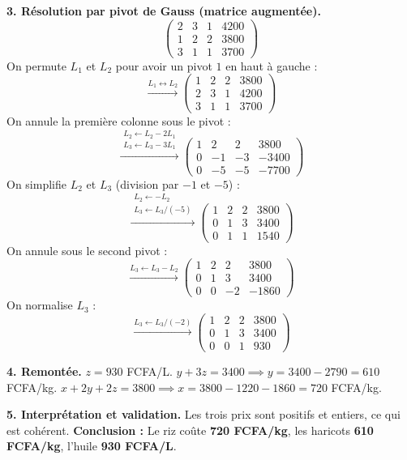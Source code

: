 \documentclass[11pt]{article}
\begin{document}
\begin{exoresolu}
\noindent\textbf{3. Résolution par pivot de Gauss (matrice augmentée).}
\[
\left(\begin{array}{ccc|c}
2 & 3 & 1 & 4200 \\
1 & 2 & 2 & 3800 \\
3 & 1 & 1 & 3700
\end{array}\right)
\]
On permute $L_1$ et $L_2$ pour avoir un pivot $1$ en haut à gauche :
\[
\xrightarrow{L_1 \leftrightarrow L_2}
\left(\begin{array}{ccc|c}
1 & 2 & 2 & 3800 \\
2 & 3 & 1 & 4200 \\
3 & 1 & 1 & 3700
\end{array}\right)
\]
On annule la première colonne sous le pivot :
\[
\xrightarrow{\substack{L_2 \leftarrow L_2 - 2L_1 \\ L_3 \leftarrow L_3 - 3L_1}}
\left(\begin{array}{ccc|c}
1 & 2 & 2 & 3800 \\
0 & -1 & -3 & -3400 \\
0 & -5 & -5 & -7700
\end{array}\right)
\]
On simplifie $L_2$ et $L_3$ (division par $-1$ et $-5$) :
\[
\xrightarrow{\substack{L_2 \leftarrow -L_2 \\ L_3 \leftarrow L_3 / (-5)}}
\left(\begin{array}{ccc|c}
1 & 2 & 2 & 3800 \\
0 & 1 & 3 & 3400 \\
0 & 1 & 1 & 1540
\end{array}\right)
\]
On annule sous le second pivot :
\[
\xrightarrow{L_3 \leftarrow L_3 - L_2}
\left(\begin{array}{ccc|c}
1 & 2 & 2 & 3800 \\
0 & 1 & 3 & 3400 \\
0 & 0 & -2 & -1860
\end{array}\right)
\]
On normalise $L_3$ :
\[
\xrightarrow{L_3 \leftarrow L_3 / (-2)}
\left(\begin{array}{ccc|c}
1 & 2 & 2 & 3800 \\
0 & 1 & 3 & 3400 \\
0 & 0 & 1 & 930
\end{array}\right)
\]

\noindent\textbf{4. Remontée.}
$z = 930$ FCFA/L.
$y + 3z = 3400 \implies y = 3400 - 2790 = 610$ FCFA/kg.
$x + 2y + 2z = 3800 \implies x = 3800 - 1220 - 1860 = 720$ FCFA/kg.

\noindent\textbf{5. Interprétation et validation.}
Les trois prix sont positifs et entiers, ce qui est cohérent.
\textbf{Conclusion :} Le riz coûte \textbf{720 FCFA/kg}, les haricots \textbf{610 FCFA/kg}, l'huile \textbf{930 FCFA/L}.
\end{exoresolu}
\end{document}
